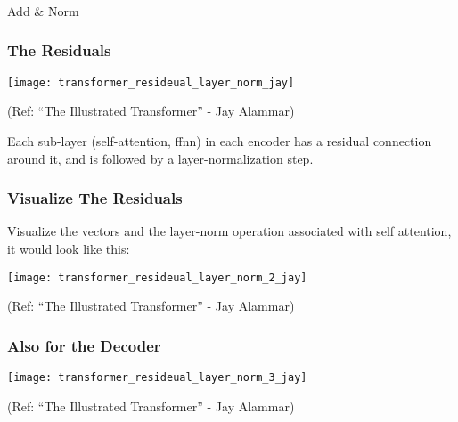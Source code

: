\begin{frame}[fragile]\frametitle{}
\begin{center}
{\Large Add \& Norm}
\end{center}
\end{frame}

\begin{frame}[fragile]\frametitle{The Residuals}


\begin{center}
\texttt{[image: transformer\_resideual\_layer\_norm\_jay]}


{\tiny (Ref: ``The Illustrated Transformer'' - Jay Alammar)}
\end{center}		

Each sub-layer (self-attention, ffnn) in each encoder has a residual connection around it, and is followed by a layer-normalization step.


\end{frame}

\begin{frame}[fragile]\frametitle{Visualize The Residuals}

Visualize the vectors and the layer-norm operation associated with self attention, it would look like this:

\begin{center}
\texttt{[image: transformer\_resideual\_layer\_norm\_2\_jay]}


{\tiny (Ref: ``The Illustrated Transformer'' - Jay Alammar)}
\end{center}		

\end{frame}

\begin{frame}[fragile]\frametitle{Also for the Decoder}

\begin{center}
\texttt{[image: transformer\_resideual\_layer\_norm\_3\_jay]}


{\tiny (Ref: ``The Illustrated Transformer'' - Jay Alammar)}
\end{center}		

\end{frame}


